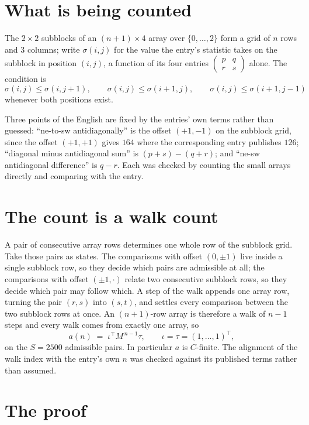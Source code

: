 \documentclass[11pt,a4paper]{article}
\theoremstyle{plain}
\theoremstyle{definition}
\begin{document}
\section{What is being counted}

The $2\times2$ subblocks of an $(n+1)\times4$ array over $\{0,\dots,2\}$ form a grid
of $n$ rows and $3$ columns; write $\sigma(i,j)$ for the value the entry's statistic takes on
the subblock in position $(i,j)$, a function of its four entries
$\begin{pmatrix}p&q\\r&s\end{pmatrix}$ alone. The condition is
\[
\sigma(i,j)\le\sigma(i,j+1),\qquad \sigma(i,j)\le\sigma(i+1,j),\qquad \sigma(i,j)\le\sigma(i+1,j-1)
\]
whenever both positions exist.

Three points of the English are fixed by the entries' own terms rather than guessed:
``ne-to-sw antidiagonally'' is the offset $(+1,-1)$ on the subblock grid, since the offset
$(+1,+1)$ gives $164$ where the corresponding entry publishes $126$; ``diagonal minus
antidiagonal sum'' is $(p+s)-(q+r)$; and ``ne-sw antidiagonal difference'' is $q-r$. Each was
checked by counting the small arrays directly and comparing with the entry.

\section{The count is a walk count}

A pair of consecutive array rows determines one whole row of the subblock grid. Take those
pairs as states. The comparisons with offset $(0,\pm1)$ live inside a single subblock row, so
they decide which pairs are admissible at all; the comparisons with offset $(\pm1,\cdot)$
relate two consecutive subblock rows, so they decide which pair may follow which. A step of the
walk appends one array row, turning the pair $(r,s)$ into $(s,t)$, and settles every comparison
between the two subblock rows at once. An $(n+1)$-row array is therefore a walk of $n-1$ steps
and every walk comes from exactly one array, so
\[
a(n)\;=\;\iota^{\!\top}M^{\,n-1}\tau,\qquad \iota=\tau=(1,\dots,1)^{\!\top},
\]
on the $S=2500$ admissible pairs. In particular $a$ is $C$-finite. The alignment of the walk
index with the entry's own $n$ was checked against its published terms rather than assumed.

\section{The proof}
\end{document}
